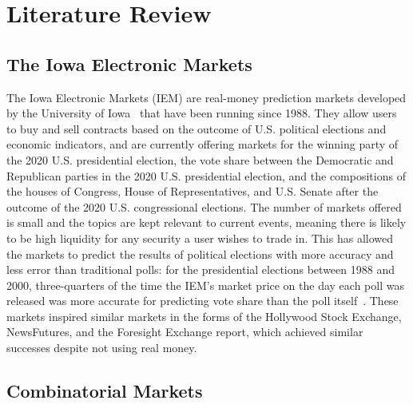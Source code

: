 \section{Literature Review}

\label{sec:literatureReview}


\subsection{The Iowa Electronic Markets}

The Iowa Electronic Markets (IEM) are real-money prediction markets developed
by the University of Iowa~\cite{IEM} that have been running since 1988. They
allow users to buy and sell contracts based on the outcome of U.S. political
elections and economic indicators, and are currently offering markets for the
winning party of the 2020 U.S. presidential election, the vote share between
the Democratic and Republican parties in the 2020 U.S. presidential election,
and the compositions of the houses of Congress, House of Representatives, and
U.S. Senate after the outcome of the 2020 U.S. congressional elections. The
number of markets offered is small and the topics are kept relevant to current
events, meaning there is likely to be high liquidity for any security a user
wishes to trade in. This has allowed the markets to predict the results of
political elections with more accuracy and less error than traditional polls:
for the presidential elections between 1988 and 2000, three-quarters of the
time the IEM's market price on the day each poll was released was more accurate
for predicting vote share than the poll itself~\cite[pg.~19]{WisdomOfCrowds}.
These markets inspired similar markets in the forms of the Hollywood Stock
Exchange, NewsFutures, and the Foresight Exchange report, which achieved
similar successes despite not using real money. 

\subsection{Combinatorial Markets}

